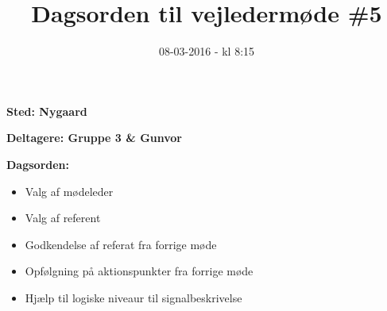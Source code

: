 \documentclass{article}
\title{Dagsorden til vejledermøde \#5}
\date{08-03-2016 - kl 8:15}
\begin{document}
	\maketitle

	\textbf{Sted: Nygaard}
	
	\textbf{Deltagere: Gruppe 3 \& Gunvor}
	
	\textbf{Dagsorden:}
	\begin{itemize}
		\item Valg af mødeleder
		\item Valg af referent
		\item Godkendelse af referat fra forrige møde 
		\item Opfølgning på aktionspunkter fra forrige møde
		\item Hjælp til logiske niveaur til signalbeskrivelse
	\end{itemize}
\end{document}
